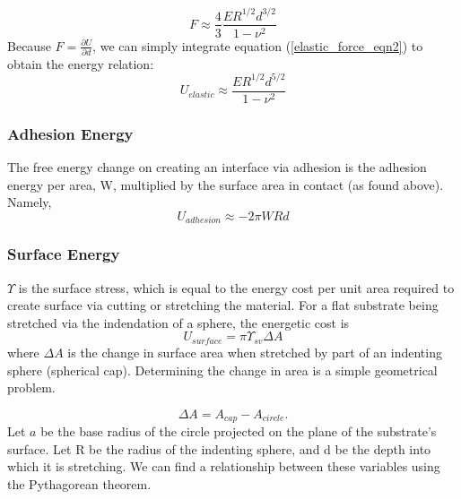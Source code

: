 \begin{equation}
F \approx \frac{4}{3}\frac{ER^{1/2}d^{3/2}}{1-\nu^2}
\label{elastic_force_eqn2}
\end{equation}
Because $F = \frac{\partial U}{\partial d}$, we can simply integrate equation (\ref{elastic_force_eqn2}) to obtain the energy relation:
\begin{equation}
\label{elastic_energy}
U_{elastic} \approx  \frac{ER^{1/2}d^{5/2}}{1-\nu^2}
\end{equation}


\subsubsection{Adhesion Energy}
The free energy change on creating an interface via adhesion is the adhesion energy per area, W, multiplied by the surface area in contact (as found above). Namely,
\begin{equation}
\label{W_energy}
U_{adhesion} \approx -2\pi W R d 
\end{equation}


\subsubsection{Surface Energy}
$\Upsilon$ is the surface stress, which is equal to the energy cost per unit area required to create surface via cutting or stretching the material. For a flat substrate being stretched via the indendation of a sphere, the energetic cost is
\begin{equation}
\label{generic_surface_energy}
U_{surface} = \pi \Upsilon_{sv}\Delta A
\end{equation}
where $\Delta A$ is the change in surface area when stretched by part of an indenting sphere (spherical cap). Determining the change in area is a simple geometrical problem.

\begin{equation}
\Delta A = A_{cap} - A_{circle}. 
\end{equation}
Let $ a $ be the base radius of the circle projected on the plane of the substrate's surface. Let R be the radius of the indenting sphere, and d be the depth into which it is stretching. We can find a relationship between these variables using the Pythagorean theorem.


